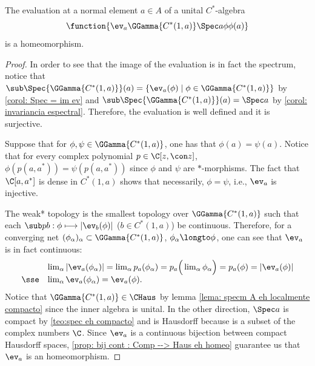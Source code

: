 \begin{proposicao}
\label{prop: ev_a eh homeo}
The evaluation at a normal element $a\in A$ of a unital $C^*$-algebra
\begin{equation*}
    \function{{\ev_a}{\GGamma{C^*(1,a)}}{\Spec a}{\phi}{\phi(a)}}
\end{equation*}
is a homeomorphism.
\end{proposicao}
\begin{proof}
In order to see that the image of the evaluation is in fact the spectrum, notice that $\sub\Spec{\GGamma{C^*(1,a)}}(a) = \{\ev_a(\phi) \mid \phi \in \GGamma{C^*(1,a)}\}$ by \ref{corol: Spec = im ev} and $\sub\Spec{\GGamma{C^*(1,a)}}(a) = \Spec a$ by \ref{corol: invariancia espectral}. Therefore, the evaluation is well defined and it is surjective.

Suppose that for $\phi, \psi \in \GGamma{C^*(1,a)}$, one has that $\phi(a) = \psi(a)$. Notice that for every complex polynomial $p\in \C[z,\con z]$, $\phi(p(a,a^*)) = \psi(p(a,a^*))$ since $\phi$ and $\psi$ are $*$-morphisms. The fact that $\C[a,a^*]$ is dense in $C^*(1,a)$ shows that necessarily, $\phi=\psi$, i.e., $\ev_a$ is injective.

The weak* topology is the smallest topology over $\GGamma{C^*(1,a)}$ such that each $\sub pb: \phi \longmapsto |\ev_b(\phi)|$  ($b\in C^*(1,a)$) be continuous. Therefore, for a converging net $(\phi_\alpha)_\alpha \subset \GGamma{C^*(1,a)}$, $\phi_\alpha \longto \phi$, one can see that $\ev_a$ is in fact continuous:
\begin{equation*}
    \begin{array}{rl}
     & \lim_\alpha |\ev_a(\phi_\alpha)|= \lim_\alpha p_a(\phi_\alpha)=  p_a\Big(\lim_\alpha\phi_\alpha\Big) = p_a(\phi) = |\ev_a(\phi)| \\
     \sse & \lim_\alpha \ev_a(\phi_\alpha) = \ev_a(\phi). 
\end{array}
\end{equation*}
Notice that $\GGamma{C^*(1,a)}\in \CHaus$ by lemma \ref{lema: specm A eh localmente compacto} since the inner algebra is unital. In the other direction, $\Spec a$ is compact by \ref{teo:spec eh compacto} and is Hausdorff because is a subset of the complex numbers $\C$. Since $\ev_a$ is a continuous bijection between compact Hausdorff spaces, \ref{prop: bij cont : Comp --> Haus eh homeo} guarantee us that $\ev_a$ is an homeomorphism.  
\end{proof}


